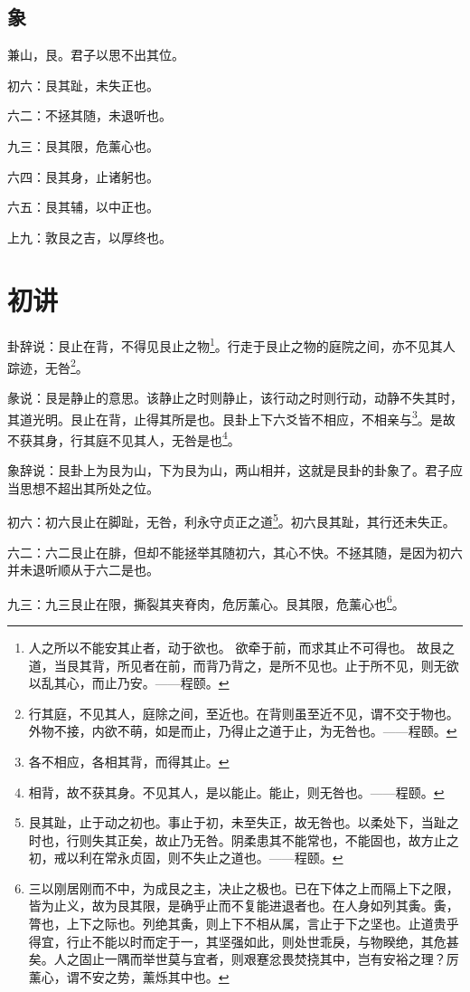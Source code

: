 \documentclass[12pt,oneside]{book}
\begin{document}
\subsection{象}
兼山，艮。君子以思不出其位。

初六：艮其趾，未失正也。

六二：不拯其随，未退听也。

九三：艮其限，危薰心也。

六四：艮其身，止诸躬也。

六五：艮其辅，以中正也。

上九：敦艮之吉，以厚终也。

\section{初讲}
卦辞说：艮止在背，不得见艮止之物\footnote{人之所以不能安其止者，动于欲也。 欲牵于前，而求其止不可得也。 故艮之道，当艮其背，所见者在前，而背乃背之，是所不见也。止于所不见，则无欲以乱其心，而止乃安。——程颐。}。行走于艮止之物的庭院之间，亦不见其人踪迹，无咎\footnote{行其庭，不见其人，庭除之间，至近也。在背则虽至近不见，谓不交于物也。外物不接，内欲不萌，如是而止，乃得止之道于止，为无咎也。——程颐。}。

彖说：艮是静止的意思。该静止之时则静止，该行动之时则行动，动静不失其时，其道光明。艮止在背，止得其所是也。艮卦上下六爻皆不相应，不相亲与\footnote{各不相应，各相其背，而得其止。}。是故不获其身，行其庭不见其人，无咎是也\footnote{相背，故不获其身。不见其人，是以能止。能止，则无咎也。——程颐。}。

象辞说：艮卦上为艮为山，下为艮为山，两山相并，这就是艮卦的卦象了。君子应当思想不超出其所处之位。

初六：初六艮止在脚趾，无咎，利永守贞正之道\footnote{艮其趾，止于动之初也。事止于初，未至失正，故无咎也。以柔处下，当趾之时也，行则失其正矣，故止乃无咎。阴柔患其不能常也，不能固也，故方止之初，戒以利在常永贞固，则不失止之道也。——程颐。}。初六艮其趾，其行还未失正。

六二：六二艮止在腓，但却不能拯举其随初六，其心不快。不拯其随，是因为初六并未退听顺从于六二是也。

九三：九三艮止在限，撕裂其夹脊肉，危厉薰心。艮其限，危薰心也\footnote{三以刚居刚而不中，为成艮之主，决止之极也。已在下体之上而隔上下之限，皆为止义，故为艮其限，是确乎止而不复能进退者也。在人身如列其夤。夤，膂也，上下之际也。列绝其夤，则上下不相从属，言止于下之坚也。止道贵乎得宜，行止不能以时而定于一，其坚强如此，则处世乖戾，与物睽绝，其危甚矣。人之固止一隅而举世莫与宜者，则艰蹇忿畏焚挠其中，岂有安裕之理？厉薰心，谓不安之势，薰烁其中也。}。
\end{document}
